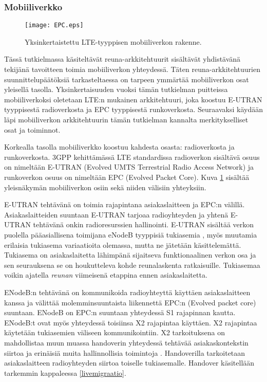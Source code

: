 \subsubsection{Mobiiliverkko}
\begin{figure}[tb]
\texttt{[image: EPC.eps]}
\caption{Yksinkertaistettu LTE-tyyppisen mobiiliverkon rakenne.} \label{fig:mobiarch}
\end{figure}

Tässä tutkielmassa käsiteltävät reuna-arkkitehtuurit sisältävät yhdistävänä tekijänä tavoitteen toimia mobiiliverkon yhteydessä. 
Täten reuna-arkkitehtuurien suunnittelupäätöksiä tarkasteltaessa on tarpeen ymmärtää mobiiliverkon osat yleisellä tasolla.
Yksinkertaisuuden vuoksi tämän tutkielman puitteissa mobiiliverkoksi oletetaan LTE:n mukainen arkkitehtuuri, joka koostuu E-UTRAN tyyppisestä radioverkosta ja EPC tyyppisestä runkoverkosta.
Seuraavaksi käydään läpi mobiiliverkon arkkitehtuurin tämän tutkielman kannalta merkitykselliset osat ja toiminnot.

Korkealla tasolla mobiiliverkko koostuu kahdesta osasta: radioverkosta ja runkoverkosta. 3GPP kehittämässä LTE standardissa radioverkon sisältävä osuus on nimeltään E-UTRAN (Evolved UMTS Terrestrial Radio Access Network) ja runkoverkon osuus on nimeltään EPC (Evolved Packet Core). Kuva \ref{fig:mobiarch} sisältää yleisnäkymän mobiiliverkon osiin sekä niiden välisiin yhteyksiin.

E-UTRAN tehtävänä on toimia rajapintana asiakaslaitteen ja EPC:n välillä. Asiakaslaitteiden suuntaan E-UTRAN tarjoaa radioyhteyden ja yhtenä E-UTRAN tehtävänä onkin radioresurssien hallinointi. 
E-UTRAN sisältää verkon puolella pääasiallisena toimijana eNodeB tyyppisiä tukiasemia \cite{etsieutran}, myös muutamia erilaisia tukiasema variaatioita olemassa, mutta ne jätetään käsittelemättä.
Tukiasema on asiakaslaitetta lähimpänä sijaitseva funktionaalinen verkon osa ja sen seurauksena se on houkutteleva kohde reunalaskenta ratkaisuille. Tukiasemaa voikin ajatella \textit{reunan} viimeisenä etappina ennen asiakaslaitetta. 

ENodeB:n tehtävänä on kommunikoida radioyhteyttä käyttäen asiakaslaitteen kanssa ja välittää molemminsuuntaista liikennettä EPC:n (Evolved packet core) suuntaan. ENodeB on EPC:n suuntaan yhteydessä S1 rajapinnan kautta. ENodeB:t ovat myös yhteydessä toisiinsa X2 rajapintaa käyttäen. 
X2 rajapintaa käytetään tukiasemien väliseen kommunikointiin. X2 tarkoituksena on mahdollistaa muun muassa handoverin yhteydessä tehtävää asiakaskontekstin siirtoa ja erinäisiä muita hallinnollisia toimintoja \cite{3gpplte}.  
Handoverilla tarkoitetaan asiakaslaitteen radioyhteyden siirtoa toiselle tukiasemalle. Handover käsitellään tarkemmin kappaleessa \ref{livemigraatio}.

